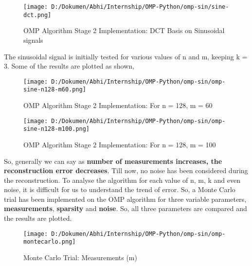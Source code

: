 \documentclass[
  letterpaper,
  DIV=11,
  numbers=noendperiod]{scrartcl}
\begin{document}
\begin{figure}[H]

{\centering \texttt{[image: D:/Dokumen/Abhi/Internship/OMP-Python/omp-sin/sine-dct.png]}

}

\caption{OMP Algorithm Stage 2 Implementation: DCT Basis on Sinusoidal
signals}

\end{figure}%

The sinusoidal signal is initially tested for various values of n and m,
keeping k = 3. Some of the results are plotted as shown,

\begin{figure}[H]

{\centering \texttt{[image: D:/Dokumen/Abhi/Internship/OMP-Python/omp-sin/omp-sine-n128-m60.png]}

}

\caption{OMP Algorithm Stage 2 Implementation: For n = 128, m = 60}

\end{figure}%

\begin{figure}[H]

{\centering \texttt{[image: D:/Dokumen/Abhi/Internship/OMP-Python/omp-sin/omp-sine-n128-m100.png]}

}

\caption{OMP Algorithm Stage 2 Implementation: For n = 128, m = 100}

\end{figure}%

So, generally we can say as \textbf{number of measurements increases,
the reconstruction error decreases}. Till now, no noise has been
considered during the reconstruction. To analyse the algorithm for each
value of n, m, k and even noise, it is difficult for us to understand
the trend of error. So, a Monte Carlo trial has been implemented on the
OMP algorithm for three variable parameters, \textbf{measurements},
\textbf{sparsity} and \textbf{noise}. So, all three parameters are
compared and the results are plotted.

\begin{figure}[H]

{\centering \texttt{[image: D:/Dokumen/Abhi/Internship/OMP-Python/omp-sin/omp-montecarlo.png]}

}

\caption{Monte Carlo Trial: Measurements (m)}

\end{figure}%
\end{document}
